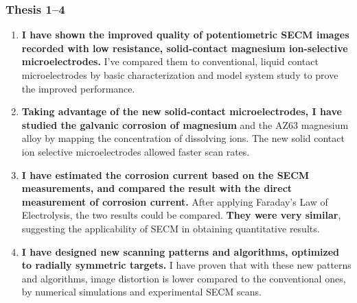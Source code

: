 \documentclass{beamer}
\begin{document}
\begin{frame}
\frametitle{Thesis 1--4}
\scriptsize
\begin{enumerate}
\item \textbf{I have shown the improved quality of potentiometric SECM images recorded with low resistance, solid-contact magnesium ion-selective microelectrodes.}
I've compared them to conventional, liquid contact microelectrodes by basic characterization and model system study to prove the improved performance.

\item \textbf{Taking advantage of the new solid-contact microelectrodes, I have studied the galvanic corrosion of magnesium} and the AZ63 magnesium alloy by mapping the concentration of dissolving ions.
The new solid contact ion selective microelectrodes allowed faster scan rates.

\item \textbf{I have estimated the corrosion current based on the SECM measurements, and compared the result with the direct measurement of corrosion current.}
After applying Faraday's Law of Electrolysis, the two results could be compared.
\textbf{They were very similar}, suggesting the applicability of SECM in obtaining quantitative results.

\item \textbf{I have designed new scanning patterns and algorithms, optimized to radially symmetric targets.}
I have proven that with these new patterns and algorithms, image distortion is lower compared to the conventional ones, by numerical simulations and experimental SECM scans.
\end{enumerate}
\end{frame}
\end{document}

